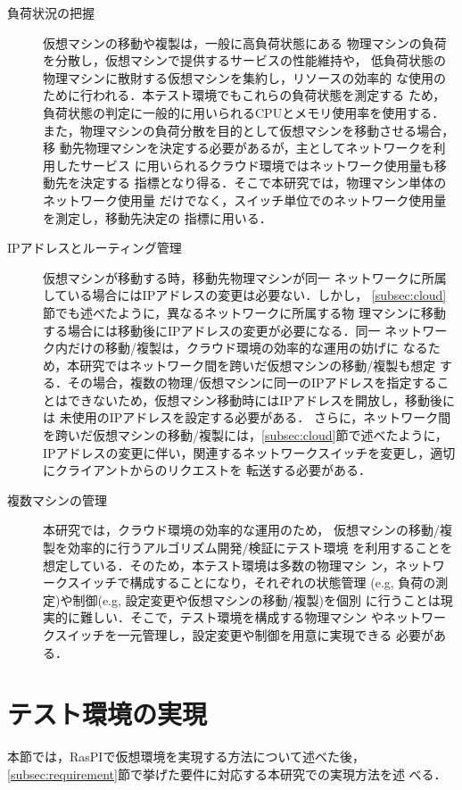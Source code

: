 \documentclass[submit,techrep]{ipsj}
\begin{document}
\begin{description}
\item [負荷状況の把握]仮想マシンの移動や複製は，一般に高負荷状態にある
  物理マシンの負荷を分散し，仮想マシンで提供するサービスの性能維持や，
  低負荷状態の物理マシンに散財する仮想マシンを集約し，リソースの効率的
  な使用のために行われる．本テスト環境でもこれらの負荷状態を測定する
  ため，負荷状態の判定に一般的に用いられるCPUとメモリ使用率を使用する．
  また，物理マシンの負荷分散を目的として仮想マシンを移動させる場合，移
  動先物理マシンを決定する必要があるが，主としてネットワークを利用したサービス
  に用いられるクラウド環境ではネットワーク使用量も移動先を決定する
  指標となり得る．そこで本研究では，物理マシン単体のネットワーク使用量
  だけでなく，スイッチ単位でのネットワーク使用量を測定し，移動先決定の
  指標に用いる．

\item [IPアドレスとルーティング管理]仮想マシンが移動する時，移動先物理マシンが同一
  ネットワークに所属している場合にはIPアドレスの変更は必要ない．しかし，
  \ref{subsec:cloud}節でも述べたように，異なるネットワークに所属する物
  理マシンに移動する場合には移動後にIPアドレスの変更が必要になる．同一
  ネットワーク内だけの移動/複製は，クラウド環境の効率的な運用の妨げに
  なるため，本研究ではネットワーク間を跨いだ仮想マシンの移動/複製も想定
  する．その場合，複数の物理/仮想マシンに同一のIPアドレスを指定するこ
  とはできないため，仮想マシン移動時にはIPアドレスを開放し，移動後には
  未使用のIPアドレスを設定する必要がある．
  さらに，ネットワーク間を跨いだ仮想マシンの移動/複製には，\ref{subsec:cloud}節で述べたように，
  IPアドレスの変更に伴い，関連するネットワークスイッチを変更し，適切にクライアントからのリクエストを
  転送する必要がある．

\item [複数マシンの管理]本研究では，クラウド環境の効率的な運用のため，
  仮想マシンの移動/複製を効率的に行うアルゴリズム開発/検証にテスト環境
  を利用することを想定している．そのため，本テスト環境は多数の物理マシ
  ン，ネットワークスイッチで構成することになり，それぞれの状態管理
  (e.g, 負荷の測定)や制御(e.g, 設定変更や仮想マシンの移動/複製)を個別
  に行うことは現実的に難しい．そこで，テスト環境を構成する物理マシン
  やネットワークスイッチを一元管理し，設定変更や制御を用意に実現できる
  必要がある．

\end{description}

\section{テスト環境の実現}
本節では，RasPIで仮想環境を実現する方法について述べた後，
\ref{subsec:requirement}節で挙げた要件に対応する本研究での実現方法を述
べる．
\end{document}
